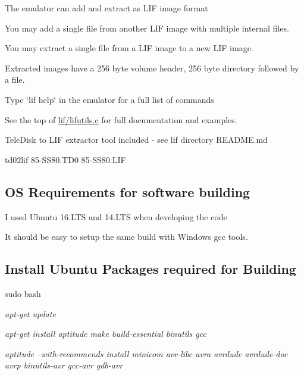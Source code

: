 \begin{DoxyItemize}
\begin{DoxyItemize}
\begin{DoxyItemize}
\item The emulator can add and extract as L\+IF image format
\begin{DoxyItemize}
\item You may add a single file from another L\+IF image with multiple internal files.
\item You may extract a single file from a L\+IF image to a new L\+IF image.
\item Extracted images have a 256 byte volume header, 256 byte directory followed by a file.
\end{DoxyItemize}
\item Type \char`\"{}lif help\char`\"{} in the emulator for a full list of commands
\begin{DoxyItemize}
\item See the top of \hyperlink{lifutils_8c}{lif/lifutils.\+c} for full documentation and examples.
\end{DoxyItemize}
\item Tele\+Disk to L\+IF extractor tool included -\/ see lif directory R\+E\+A\+D\+M\+E.\+md
\begin{DoxyItemize}
\item td02lif 85-\/\+S\+S80.\+T\+D0 85-\/\+S\+S80.\+L\+IF 

 \subsection*{OS Requirements for software building}
\end{DoxyItemize}
\end{DoxyItemize}
\end{DoxyItemize}
\end{DoxyItemize}

I used Ubuntu 16.\+L\+TS and 14.\+L\+TS when developing the code
\begin{DoxyItemize}
\item It should be easy to setup the same build with Windows gcc tools.
\end{DoxyItemize}

\subsection*{Install Ubuntu Packages required for Building}


\begin{DoxyItemize}
\item sudo bash
\item {\itshape apt-\/get update}
\item {\itshape apt-\/get install aptitude make build-\/essential binutils gcc}
\item {\itshape aptitude --with-\/recommends install minicom avr-\/libc avra avrdude avrdude-\/doc avrp binutils-\/avr gcc-\/avr gdb-\/avr}
\end{DoxyItemize}

